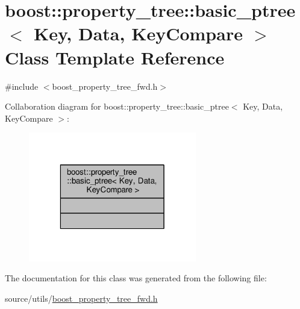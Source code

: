\hypertarget{classboost_1_1property__tree_1_1basic__ptree}{\section{boost\-:\-:property\-\_\-tree\-:\-:basic\-\_\-ptree$<$ Key, Data, Key\-Compare $>$ Class Template Reference}
\label{classboost_1_1property__tree_1_1basic__ptree}
}


{\ttfamily \#include $<$boost\-\_\-property\-\_\-tree\-\_\-fwd.\-h$>$}



Collaboration diagram for boost\-:\-:property\-\_\-tree\-:\-:basic\-\_\-ptree$<$ Key, Data, Key\-Compare $>$\-:
\nopagebreak
\begin{figure}[H]
\begin{center}
\leavevmode
\includegraphics[width=208pt]{classboost_1_1property__tree_1_1basic__ptree__coll__graph}
\end{center}
\end{figure}


The documentation for this class was generated from the following file\-:\begin{DoxyCompactItemize}
\item 
source/utils/\hyperlink{boost__property__tree__fwd_8h}{boost\-\_\-property\-\_\-tree\-\_\-fwd.\-h}\end{DoxyCompactItemize}
